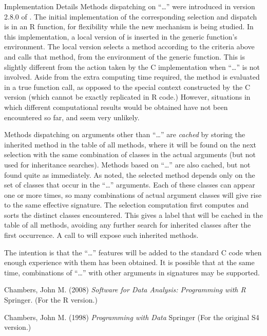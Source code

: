 %
\begin{Section}{Implementation Details}
Methods dispatching on ``\dots'' were introduced in version 2.8.0 of
\R{}.  The initial implementation of the corresponding selection and
dispatch is in an R function, for flexibility while the new
mechanism is being studied.  In this implementation, a local version
of  is inserted in the generic function's
environment.  The local version selects a method according to the
criteria above and calls that method, from the environment of the
generic function.  This is slightly different from the action taken
by the C implementation when ``\dots'' is not involved.  Aside from the
extra computing time required, the method is evaluated in a true
function call, as opposed to the special context constructed by the
C version (which cannot be exactly replicated in R code.)  However,
situations in which different computational results would
be obtained have not been encountered so far, and seem very
unlikely.

Methods dispatching on arguments other than ``\dots'' are \emph{cached} by storing
the inherited method in the table of all methods, where it will be
found on the next selection with the same combination of classes
in the actual arguments (but not used for inheritance searches).
Methods based on ``\dots'' are also cached, but not found quite
as immediately.  As noted, the selected method depends only on the
set of classes that occur in the ``\dots'' arguments.  Each of
these classes can appear one or more times, so many combinations of
actual argument classes will give rise to the same effective
signature.  The selection computation first computes and sorts the
distinct classes encountered.  This gives a label that will be
cached in the table of all methods, avoiding any further search for
inherited classes after the first occurrence.  A call to
 will expose such inherited methods.

The intention is that the ``\dots'' features will be added to the
standard C code when enough experience with them has been obtained.
It is possible that at the same time, combinations of ``\dots'' with
other arguments in signatures may be supported.
\end{Section}
%
\begin{References}\relax
Chambers, John M. (2008)
\emph{Software for Data Analysis: Programming with R}
Springer.  (For the R version.)

Chambers, John M. (1998)
\emph{Programming with Data}
Springer (For the original S4 version.)
\end{References}

